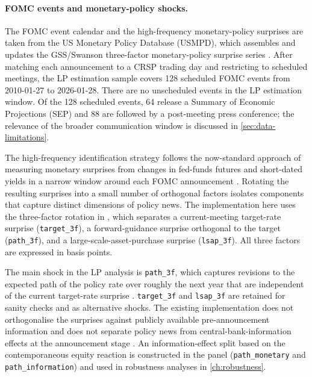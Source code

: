\paragraph{FOMC events and monetary-policy shocks.} The FOMC event calendar and the high-frequency monetary-policy surprises are taken from the US Monetary Policy Database (USMPD), which assembles and updates the GSS/Swanson three-factor monetary-policy surprise series \citep{gurkaynakSackSwanson2005, swanson2021, acostaEtAl2025}. After matching each announcement to a CRSP trading day and restricting to scheduled meetings, the LP estimation sample covers 128 scheduled FOMC events from \mbox{2010-01-27} to \mbox{2026-01-28}. There are no unscheduled events in the LP estimation window. Of the 128 scheduled events, 64 release a Summary of Economic Projections (SEP) and 88 are followed by a post-meeting press conference; the relevance of the broader communication window is discussed in \cref{sec:data-limitations}.

The high-frequency identification strategy follows the now-standard approach of measuring monetary surprises from changes in fed-funds futures and short-dated yields in a narrow window around each FOMC announcement \citep{bernankeKuttner2005, rigobonSack2004, nakamuraSteinsson2018}. Rotating the resulting surprises into a small number of orthogonal factors isolates components that capture distinct dimensions of policy news. The implementation here uses the three-factor rotation in \citet{swanson2021}, which separates a current-meeting target-rate surprise (\texttt{target\_3f}), a forward-guidance surprise orthogonal to the target (\texttt{path\_3f}), and a large-scale-asset-purchase surprise (\texttt{lsap\_3f}). All three factors are expressed in basis points.

The main shock in the LP analysis is \texttt{path\_3f}, which captures revisions to the expected path of the policy rate over roughly the next year that are independent of the current target-rate surprise \citep{gurkaynakSackSwanson2005, swanson2021, bauerSwanson2023}. \texttt{target\_3f} and \texttt{lsap\_3f} are retained for sanity checks and as alternative shocks. The existing implementation does not orthogonalise the surprises against publicly available pre-announcement information \citep[][on the case for such orthogonalisation]{bauerSwanson2023} and does not separate policy news from central-bank-information effects at the announcement stage \citep[][]{jarocinskiKaradi2020, mirandaAgrippinoRicco2021, cieslakSchrimpf2019}. An information-effect split based on the contemporaneous equity reaction is constructed in the panel (\texttt{path\_monetary} and \texttt{path\_information}) and used in robustness analyses in \cref{ch:robustness}.

